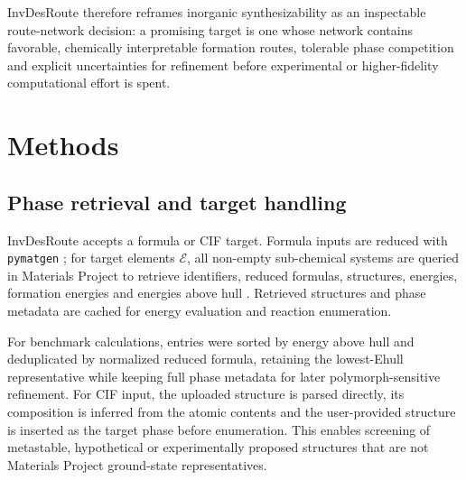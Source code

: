 \documentclass[11pt, letterpaper]{article}
\newcommand{\invdesroute}{InvDesRoute}
\begin{document}
\invdesroute{} therefore reframes inorganic synthesizability as an inspectable route-network decision: a promising target is one whose network contains favorable, chemically interpretable formation routes, tolerable phase competition and explicit uncertainties for refinement before experimental or higher-fidelity computational effort is spent.

\section*{Methods}

\subsection*{Phase retrieval and target handling}

\invdesroute{} accepts a formula or CIF target. Formula inputs are reduced with \texttt{pymatgen} \cite{ong2013pymatgen}; for target elements $\mathcal{E}$, all non-empty sub-chemical systems are queried in Materials Project to retrieve identifiers, reduced formulas, structures, energies, formation energies and energies above hull \cite{jain2013materialsproject}. Retrieved structures and phase metadata are cached for energy evaluation and reaction enumeration.

For benchmark calculations, entries were sorted by energy above hull and deduplicated by normalized reduced formula, retaining the lowest-Ehull representative while keeping full phase metadata for later polymorph-sensitive refinement. For CIF input, the uploaded structure is parsed directly, its composition is inferred from the atomic contents and the user-provided structure is inserted as the target phase before enumeration. This enables screening of metastable, hypothetical or experimentally proposed structures that are not Materials Project ground-state representatives.
\end{document}
